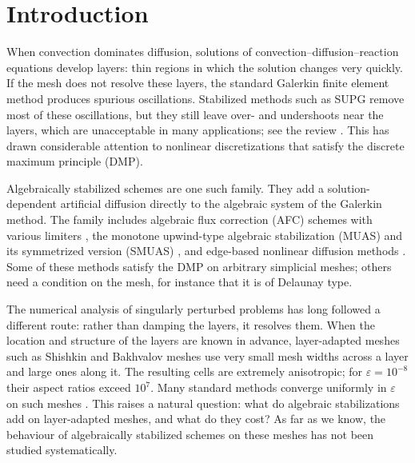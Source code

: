 \documentclass[11pt,a4paper]{article}
\newcommand{\eps}{\varepsilon}
\theoremstyle{remark}
\begin{document}
\section{Introduction}

When convection dominates diffusion, solutions of convection--diffusion--reaction equations develop layers: thin
regions in which the solution changes very quickly. If the mesh does not resolve these layers, the standard Galerkin
finite element method produces spurious oscillations. Stabilized methods such as SUPG \cite{BH82} remove most of
these oscillations, but they still leave over- and undershoots near the layers, which are unacceptable in many
applications; see the review \cite{JK07}. This has drawn considerable attention to nonlinear discretizations that
satisfy the discrete maximum principle (DMP).

Algebraically stabilized schemes are one such family. They add a solution-dependent artificial diffusion directly
to the algebraic system of the Galerkin method. The family includes algebraic flux correction (AFC) schemes with
various limiters \cite{Kuz07,BJK16,BJK17,Kuz20}, the monotone upwind-type algebraic stabilization (MUAS) \cite{JK22}
and its symmetrized version (SMUAS) \cite{Kno23}, and edge-based nonlinear diffusion methods \cite{BBK17,ABR17}.
Some of these methods satisfy the DMP on arbitrary simplicial meshes; others need a condition on the mesh, for
instance that it is of Delaunay type.

The numerical analysis of singularly perturbed problems has long followed a different route: rather than damping
the layers, it resolves them. When the location and structure of the layers are known in advance, layer-adapted
meshes such as Shishkin and Bakhvalov meshes \cite{Bak69,MOS96,RST08,Lin10} use very small mesh widths across a
layer and large ones along it. The resulting cells are extremely anisotropic; for $\eps=10^{-8}$ their aspect
ratios exceed $10^7$. Many standard methods converge uniformly in $\eps$ on such meshes \cite{RST08,Lin10}. This
raises a natural question: what do algebraic stabilizations add on layer-adapted meshes, and what do they cost?
As far as we know, the behaviour of algebraically stabilized schemes on these meshes has not been studied
systematically.
\end{document}
